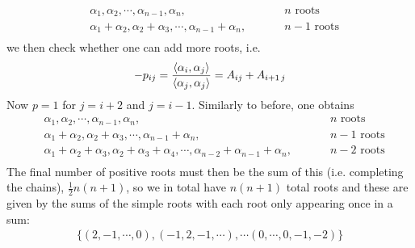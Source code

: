 \documentclass[a4paper,12pt]{article}
\begin{document}
\begin{equation}
	\begin{aligned}
		&\alpha_1,\alpha_2,\cdots,\alpha_{n-1},\alpha_n,~~~~~~~~&&n\text{ roots}\\
		&\alpha_1+\alpha_2,\alpha_2+\alpha_3,\cdots,\alpha_{n-1}+\alpha_n,~~~~~~~~&&n-1\text{ roots}\\
	\end{aligned}
\end{equation}
we then check whether one can add more roots, i.e.
\begin{equation}  \label{eq:minw}
	\begin{aligned}
		-p_{ij}=\frac{\expval{\alpha_i,\alpha_j}}{\expval{\alpha_j,\alpha_j}}=A_{ij}+A_{i+1\,j}
	\end{aligned}
\end{equation}
Now $p=1$ for $j=i+2$ and $j=i-1$. Similarly to before, one obtains
\begin{equation}
	\begin{aligned}
		&\alpha_1,\alpha_2,\cdots,\alpha_{n-1},\alpha_n,~~~~~~~~&&n\text{ roots}\\
		&\alpha_1+\alpha_2,\alpha_2+\alpha_3,\cdots,\alpha_{n-1}+\alpha_n,~~~~~~~~&&n-1\text{ roots}\\
		&\alpha_1+\alpha_2+\alpha_3,\alpha_2+\alpha_3+\alpha_4,\cdots,\alpha_{n-2}+\alpha_{n-1}+\alpha_n,~~~~~~~~&&n-2\text{ roots}\\
	\end{aligned}
\end{equation}
The final number of positive roots must then be the sum of this (i.e. completing the chains), $\frac{1}{2}n(n+1)$, so we in total have $n(n+1)$ total roots and these are given by the sums of the simple roots with each root only appearing once in a sum:
\begin{equation}
	\begin{aligned}
		\{(2,-1,\cdots,0),(-1,2,-1,\cdots),\cdots(0,\cdots,0,-1,-2)\}
	\end{aligned}
\end{equation}
\end{document}

